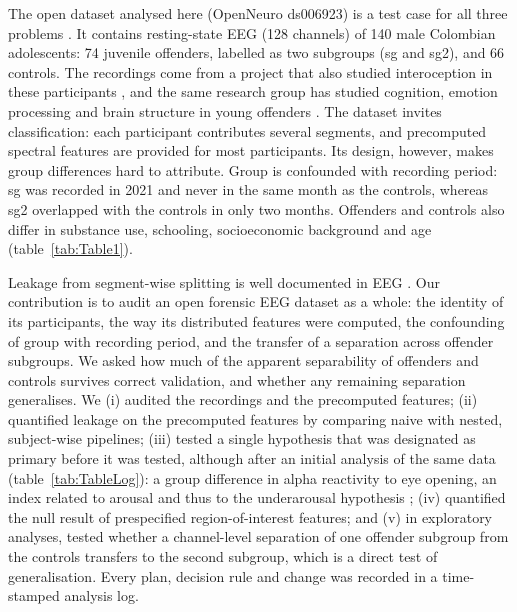 The open dataset analysed here (OpenNeuro ds006923) is a test case for all three problems \cite{Polo2025ds006923}. It contains resting-state EEG (128 channels) of 140 male Colombian adolescents: 74 juvenile offenders, labelled as two subgroups (sg and sg2), and 66 controls. The recordings come from a project that also studied interoception in these participants \cite{RodriguezAlvarez2023}, and the same research group has studied cognition, emotion processing and brain structure in young offenders \cite{Bonfante2023,SanchezTorres2024,RuizPena2024,Pino2023,Pino2019,FrancoOByrne2021,SantamariaGarcia2019}. The dataset invites classification: each participant contributes several segments, and precomputed spectral features are provided for most participants. Its design, however, makes group differences hard to attribute. Group is confounded with recording period: sg was recorded in 2021 and never in the same month as the controls, whereas sg2 overlapped with the controls in only two months. Offenders and controls also differ in substance use, schooling, socioeconomic background and age (table~\ref{tab:Table1}).

Leakage from segment-wise splitting is well documented in EEG \cite{Brookshire2024,Gil2026}. Our contribution is to audit an open forensic EEG dataset as a whole: the identity of its participants, the way its distributed features were computed, the confounding of group with recording period, and the transfer of a separation across offender subgroups. We asked how much of the apparent separability of offenders and controls survives correct validation, and whether any remaining separation generalises. We (i) audited the recordings and the precomputed features; (ii) quantified leakage on the precomputed features by comparing naive with nested, subject-wise pipelines; (iii) tested a single hypothesis that was designated as primary before it was tested, although after an initial analysis of the same data (table~\ref{tab:TableLog}): a group difference in alpha reactivity to eye opening, an index related to arousal \cite{Barry2007} and thus to the underarousal hypothesis \cite{Raine1990}; (iv) quantified the null result of prespecified region-of-interest features; and (v) in exploratory analyses, tested whether a channel-level separation of one offender subgroup from the controls transfers to the second subgroup, which is a direct test of generalisation. Every plan, decision rule and change was recorded in a time-stamped analysis log.
